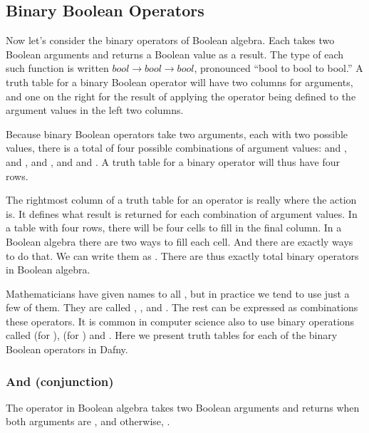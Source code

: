 \documentclass[letterpaper,10pt,english]{sphinxmanual}
\begin{document}
\subsection{Binary Boolean Operators}
\label{\detokenize{09-boolean-algebra:binary-boolean-operators}}
Now let’s consider the binary operators of Boolean algebra. Each takes
two Boolean arguments and returns a Boolean value as a result. The
type of each such function is written \(bool \rightarrow bool
\rightarrow bool\), pronounced “bool to bool to bool.” A truth table
for a binary Boolean operator will have two columns for arguments, and
one on the right for the result of applying the operator being defined
to the argument values in the left two columns.

Because binary Boolean operators take two arguments, each with two
possible values, there is a total of four possible combinations of
argument values:  and ,  and ,  and
, and  and . A truth table for a binary operator
will thus have four rows.

The rightmost column of a truth table for an operator is really where
the action is. It defines what result is returned for each combination
of argument values. In a table with four rows, there will be four
cells to fill in the final column. In a Boolean algebra there are two
ways to fill each cell. And there are exactly  ways to do
that. We can write them as . There are thus
exactly  total binary operators in Boolean algebra.

Mathematicians have given names to all , but in practice we tend
to use just a few of them. They are called , , and . The
rest can be expressed as combinations these operators.  It is common
in computer science also to use binary operations called  (for
),  (for ) and .  Here we present
truth tables for each of the binary Boolean operators in Dafny.


\subsubsection{And (conjunction)}
\label{\detokenize{09-boolean-algebra:and-conjunction}}
The  operator in Boolean algebra takes two Boolean arguments and
returns  when both arguments are , and otherwise, .
\end{document}
